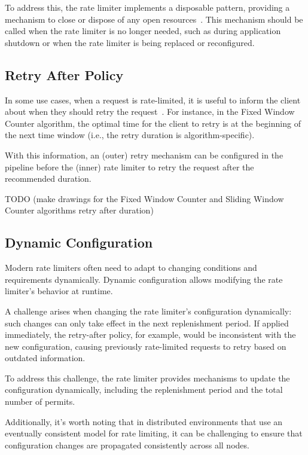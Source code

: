 To address this, the rate limiter implements a disposable pattern,
providing a mechanism to close or dispose of any open resources~\cite{microsoft-dispose-pattern}. This mechanism should be called when the rate limiter is no longer needed, such as during application shutdown or when the rate limiter is being replaced or reconfigured.

\subsection{Retry After Policy}\label{subsec:rate-limiter-retry-after-policy}

In some use cases, when a request is rate-limited, it is useful to inform the client about when they should retry the request~\cite{mdn-retry-after}.
For instance, in the Fixed Window Counter algorithm,
the optimal time for the client to retry is at the beginning of the next time window
(i.e., the retry duration is algorithm-specific).

With this information,
an (outer) retry mechanism can be configured in the pipeline before the
(inner) rate limiter to retry the request after the recommended duration.

TODO (make drawings for the Fixed Window Counter and Sliding Window Counter algorithms retry after duration)

\subsection{Dynamic Configuration}\label{subsec:rate-limiter-dynamic-configuration}

Modern rate limiters often need to adapt to changing conditions and requirements dynamically.
Dynamic configuration allows modifying the rate limiter's behavior at runtime.

A challenge arises when changing the rate limiter's configuration dynamically: such changes can only take effect in
the next replenishment period.
If applied immediately, the retry-after policy, for example, would be inconsistent with the new configuration,
causing previously rate-limited requests to retry based on outdated information.

To address this challenge, the rate limiter provides mechanisms to update the configuration dynamically, including the
replenishment period and the total number of permits.

Additionally, it's worth noting that in distributed environments that use an eventually consistent model for rate limiting,
it can be challenging to ensure that configuration changes are propagated consistently across all nodes.

